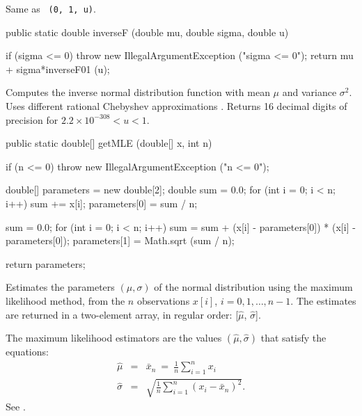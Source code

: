 \begin{tabb} Same as
~\texttt{(0, 1, u)}.
\end{tabb}
 \begin{code}

   public static double inverseF (double mu, double sigma, double u) \begin{hide} {
      if (sigma <= 0)
         throw new IllegalArgumentException ("sigma <= 0");
      return mu + sigma*inverseF01 (u);
   }\end{hide}
\end{code}
\begin{tabb}  Computes the inverse normal distribution function
  with mean $\mu$ and variance $\sigma^2$. Uses different
  rational Chebyshev approximations \cite{tBLA76a}.
  Returns 16 decimal digits of precision for $2.2\times10^{-308} < u < 1$.
\end{tabb}
\begin{code}

   public static double[] getMLE (double[] x, int n)\begin{hide} {
      if (n <= 0)
         throw new IllegalArgumentException ("n <= 0");

      double[] parameters = new double[2];
      double sum = 0.0;
      for (int i = 0; i < n; i++)
         sum += x[i];
      parameters[0] = sum / n;

      sum = 0.0;
      for (int i = 0; i < n; i++)
         sum = sum + (x[i] - parameters[0]) * (x[i] - parameters[0]);
      parameters[1] = Math.sqrt (sum / n);

      return parameters;
   }\end{hide}
\end{code}
\begin{tabb}
   Estimates the parameters $(\mu, \sigma)$ of the normal distribution
   using the maximum likelihood method, from the $n$ observations
   $x[i]$, $i = 0, 1,\ldots, n-1$. The estimates are returned in a two-element
    array, in regular order: [$\hat\mu$, $\hat\sigma$].
   \begin{detailed}
   The maximum likelihood estimators are the values $(\hat\mu , \hat\sigma)$
   that satisfy the equations:
   \begin{eqnarray*}
      \hat{\mu} & = & \bar{x}_n \ = \ \frac{1}{n} \sum_{i=1}^{n} x_i\\
      \hat{\sigma} & = & \sqrt{\frac{1}{n} \sum_{i=1}^{n} (x_i - \bar{x}_n)^2}.
   \end{eqnarray*}
   See \cite[page 123]{tJOH95a}.
   \end{detailed}
\end{tabb}
